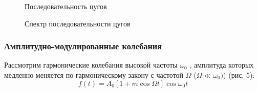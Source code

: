 \documentclass[a4paper, 12pt]{article}
\begin{document}
                \begin{figure}[ht]
                    \begin{minipage}[ht]{0.45\linewidth}
                        \caption{Последовательность цугов}
                    \end{minipage}
                    \begin{minipage}[ht]{0.45\linewidth}
                        \caption{Спектр последовательности цугов}
                    \end{minipage}
                \end{figure}

            \subsubsection{Амплитудно-модулированные колебания}

                Рассмотрим гармонические колебания высокой частоты $\omega_{0}$ , амплитуда которых медленно меняется по гармоническому закону с частотой $\Omega$ ($\Omega \ll \omega_{0})$) (рис. 5):
                \begin{equation}
                    f(t)=A_{0}[1+m\cos\Omega t]\cos \omega_{0}t
                    \label{eq7}
                \end{equation}
\end{document}

